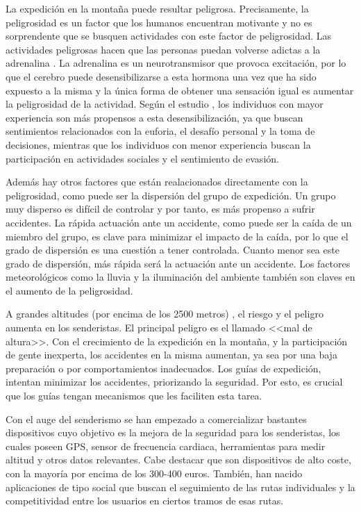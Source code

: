 La expedición en la montaña puede resultar peligrosa. Precisamente, la peligrosidad es un factor que los humanos encuentran motivante y no es sorprendente que se busquen actividades con este factor de peligrosidad. Las actividades peligrosas hacen que las personas puedan volverse adictas a la adrenalina \cite{15}. La adrenalina es un neurotransmisor que provoca excitación, por lo que el cerebro puede desensibilizarse a esta hormona una vez que ha sido expuesto a la misma y la única forma de obtener una sensación igual es aumentar la peligrosidad de la actividad. Según el estudio \cite{12}, los individuos con mayor experiencia son más propensos a esta desensibilización, ya que buscan sentimientos relacionados con la euforia, el desafío personal y la toma de decisiones, mientras que los individuos con menor experiencia buscan la participación en actividades sociales y el sentimiento de evasión.

Además hay otros factores que están realacionados directamente con la peligrosidad, como puede ser la dispersión del grupo de expedición. Un grupo muy disperso es difícil de controlar y por tanto, es más propenso a sufrir accidentes. La rápida actuación ante un accidente, como puede ser la caída de un miembro del grupo, es clave para minimizar el impacto de la caída, por lo que el grado de dispersión es una cuestión a tener controlada. Cuanto menor sea este grado de dispersión, más rápida será la actuación ante un accidente. Los factores meteorológicos como la lluvia y la iluminación del ambiente también son claves en el aumento de la peligrosidad.

A grandes altitudes (por encima de los 2500 metros) \cite{13}, el riesgo y el peligro aumenta en los senderistas. El principal peligro es el llamado <<mal de altura>>. Con el crecimiento de la expedición en la montaña, y la participación de gente inexperta, los accidentes en la misma aumentan, ya sea por una baja preparación o por comportamientos inadecuados. Los guías de expedición, intentan minimizar los accidentes, priorizando la seguridad. Por esto, es crucial que los guías tengan mecanismos que les faciliten esta tarea.

Con el auge del senderismo se han empezado a comercializar bastantes dispositivos cuyo objetivo es la mejora de la seguridad para los senderistas, los cuales poseen \acs{GPS}, sensor de frecuencia cardiaca, herramientas para medir altitud y otros datos relevantes. Cabe destacar que son dispositivos de alto coste, con la mayoría por encima de los 300-400 euros. También, han nacido aplicaciones de tipo social que buscan el seguimiento de las rutas individuales y la competitividad entre los usuarios en ciertos tramos de esas rutas.

